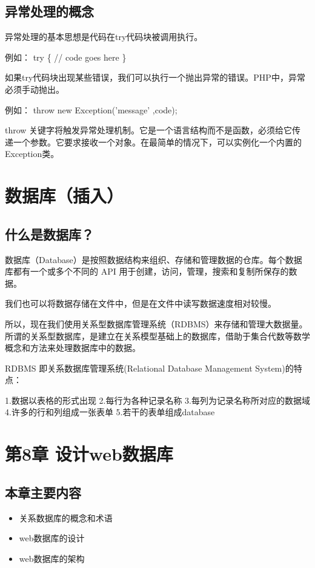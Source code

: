 \documentclass[11pt]{article}
\begin{document}
\subsection{异常处理的概念}
\label{sec:org3f9beb9}
异常处理的基本思想是代码在try代码块被调用执行。

例如：
try
\{
     // code goes here
\}

如果try代码块出现某些错误，我们可以执行一个抛出异常的错误。PHP中，异常
必须手动抛出。

例如：
throw new Exception('message' ,code);

throw 关键字将触发异常处理机制。它是一个语言结构而不是函数，必须给它传
递一个参数。它要求接收一个对象。在最简单的情况下，可以实例化一个内置的
Exception类。
\section{数据库（插入）}
\label{sec:org44d4cf3}
\subsection{什么是数据库？}
\label{sec:org968bed3}
数据库（Database）是按照数据结构来组织、存储和管理数据的仓库。每个数据库都有一个或多个不同的 API 用于创建，访问，管理，搜索和复制所保存的数据。

我们也可以将数据存储在文件中，但是在文件中读写数据速度相对较慢。

所以，现在我们使用关系型数据库管理系统（RDBMS）来存储和管理大数据量。所谓的关系型数据库，是建立在关系模型基础上的数据库，借助于集合代数等数学概念和方法来处理数据库中的数据。

RDBMS 即关系数据库管理系统(Relational Database Management System)的特点：

1.数据以表格的形式出现
2.每行为各种记录名称
3.每列为记录名称所对应的数据域
4.许多的行和列组成一张表单
5.若干的表单组成database
\section{第8章 设计web数据库}
\label{sec:orge5700a2}
\subsection{本章主要内容}
\label{sec:org8581ad4}
\begin{itemize}
\item 关系数据库的概念和术语
\item web数据库的设计
\item web数据库的架构
\end{itemize}
\end{document}
